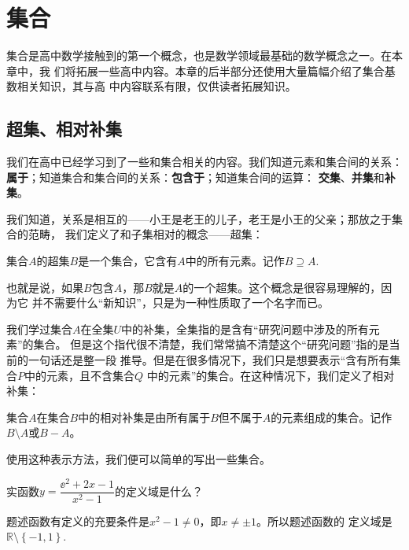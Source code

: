 \chapter{集合} \label{chap:set}

集合是高中数学接触到的第一个概念，也是数学领域最基础的数学概念之一。在本章中，我
们将拓展一些高中内容。本章的后半部分还使用大量篇幅介绍了集合基数相关知识，其与高
中内容联系有限，仅供读者拓展知识。

\section{超集、相对补集}

我们在高中已经学习到了一些和集合相关的内容。我们知道元素和集合间的关系：
\textbf{属于}；知道集合和集合间的关系：\textbf{包含于}；知道集合间的运算：
\textbf{交集}、\textbf{并集}和\textbf{补集}。

我们知道，关系是相互的——小王是老王的儿子，老王是小王的父亲；那放之于集合的范畴，
我们定义了和子集相对的概念——超集：

\begin{rawdef}[超集]
    集合$A$的超集$B$是一个集合，它含有$A$中的所有元素。记作$B \supseteq 
    A$.
\end{rawdef}

也就是说，如果$B$包含$A$，那$B$就是$A$的一个超集。这个概念是很容易理解的，因为它
并不需要什么“新知识”，只是为一种性质取了一个名字而已。

我们学过集合$A$在全集$U$中的补集，全集指的是含有“研究问题中涉及的所有元素”的集合。
但是这个指代很不清楚，我们常常搞不清楚这个“研究问题”指的是当前的一句话还是整一段
推导。但是在很多情况下，我们只是想要表示“含有所有集合$P$中的元素，且不含集合$Q$
中的元素”的集合。在这种情况下，我们定义了相对补集：

\begin{rawdef}[相对补集]
    集合$A$在集合$B$中的相对补集是由所有属于$B$但不属于$A$的元素组成的集合。记作
    $B\setminus A$或$B - A$。
\end{rawdef}

使用这种表示方法，我们便可以简单的写出一些集合。

\begin{rawexp}
    实函数$y = \dfrac{\ee^2+2x-1}{x^2-1}$的定义域是什么？
\end{rawexp}

\begin{rawsol}
    题述函数有定义的充要条件是$x^2 -1 \neq 0$，即$x \neq \pm 1$。所以题述函数的
    定义域是$\mathbb{R}\setminus \left\{ -1,1 \right\}$.
\end{rawsol}

